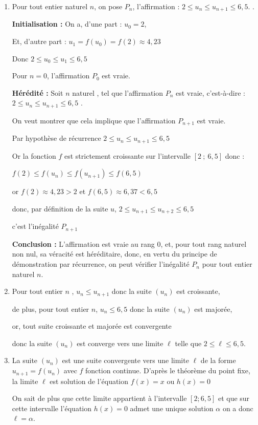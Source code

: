 \documentclass[10pt]{article}
\begin{document}
\begin{enumerate}
\item Pour tout entier naturel  $n$, on pose $P_n$, l'affirmation : \og $2 \leqslant u_{n} \leqslant u_{n+1} \leqslant 6,5$. \fg{}.

\textbf{Initialisation :} On a, d'une part : $u_0 =2 $,

Et, d'autre part : $u_1=f(u_0)=f(2)\approx 4,23$

Donc $2 \leqslant u_0 \leqslant u_1 \leqslant 6,5$

Pour $n = 0$, l'affirmation $P_0$ est vraie.

\textbf{Hérédité :} Soit $n$ naturel , tel que  l'affirmation $P_n$  est vraie, c'est-à-dire : \quad \og $2 \leqslant u_{n} \leqslant u_{n+1} \leqslant 6,5$ \fg{}.

On veut montrer que cela implique que l'affirmation $ P_{n+1} $ est vraie.

Par hypothèse de récurrence $2 \leqslant u_{n} \leqslant u_{n+1} \leqslant 6,5$ 

Or la fonction $f$ est strictement croissante sur l'intervalle $[2~;~6,5]$ donc :

$f(2) \leqslant f\left( u_{n} \right) \leqslant f\left( u_{n+1} \right) \leqslant f(6,5)$ 

or $f(2) \approx 4,23 >2$ et $f(6,5) \approx 6,37 < 6,5$

donc, par définition de la suite $u$, $  2 \leqslant u_{n+1} \leqslant u_{n+2} \leqslant 6,5$

c'est l'inégalité  $P_{n+1}$

\textbf{Conclusion :} L'affirmation est vraie au rang 0, et, pour tout rang naturel non nul, sa véracité est héréditaire, donc, en vertu du principe de démonstration par récurrence, on peut vérifier l'inégalité $ P_n $ pour tout entier naturel $n$.
\item Pour tout entier $n$ , $u_n \leqslant u_{n+1}$ donc la suite $(u_n)$ est croissante, 

de plus, pour tout entier $n$, $u_n \leqslant 6,5$ donc la suite $(u_n)$ est majorée, 

or, tout suite croissante et majorée est convergente

donc la suite $\left(u_{n}\right)$ est converge vers une limite $\ell$ telle que $2 \leqslant \ell \leqslant 6,5$.
\item La suite $(u_n)$ est une suite convergente vers une limite $\ell$ de la forme $u_{n+1}=f\left(u_{n}\right)$ avec $f$ fonction continue. 
D'après le théorème du point fixe, la limite $\ell$ est solution de l'équation $f(x)=x$ ou $h(x)=0$ 

On sait de plus que cette limite appartient à l'intervalle $[2;6,5]$ et que sur cette intervalle l'équation $h(x)=0$ admet une unique solution $\alpha$ on a donc $\ell =\alpha$.

\end{enumerate}

\medskip
\end{document}
